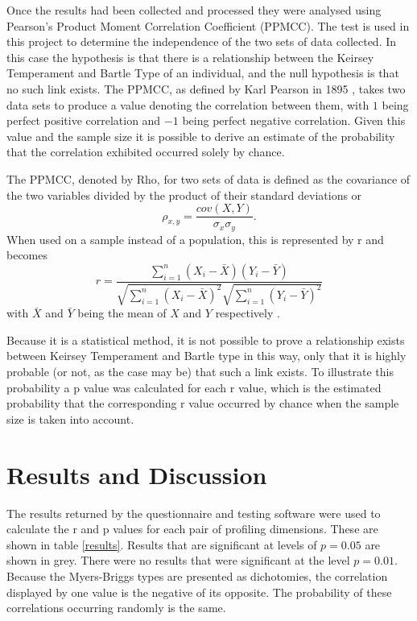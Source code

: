 \documentclass[12pt,a4paper,twoside]{report}
\begin{document}
Once the results had been collected and processed they were analysed using Pearson's Product Moment Correlation Coefficient (PPMCC). The test is used in this project to determine the independence of the two sets of data collected. In this case the hypothesis is that there is a relationship between the Keirsey Temperament and Bartle Type of an individual, and the null hypothesis is that no such link exists. The PPMCC, as defined by Karl Pearson in 1895 \cite{pearson1895note}, takes two data sets to produce a value denoting the correlation between them, with $1$ being perfect positive correlation and $-1$ being perfect negative correlation. Given this value and the sample size it is possible to derive an estimate of the probability that the correlation exhibited occurred solely by chance. 

The PPMCC, denoted by Rho, for two sets of data is defined as the covariance of the two variables divided by the product of their standard deviations or \[\rho_{x,y}=\frac{cov(X,Y)}{\sigma_x \sigma_y}.\] When used on a sample instead of a population, this is represented by r and becomes \[r=\frac{\sum_{i=1}^{n}(X_i-\bar{X})(Y_i-\bar{Y})}{\sqrt{\sum_{i=1}^{n}(X_i-\bar{X})^2}\sqrt{\sum_{i=1}^{n}(Y_i-\bar{Y})^2}}\] with $\bar{X}$ and $\bar{Y}$ being the mean of $X$ and $Y$ respectively \cite{pearson1895note}. 

\vspace{0.1cm}
Because it is a statistical method, it is not possible to prove a relationship exists between Keirsey Temperament and Bartle type in this way, only that it is highly probable (or not, as the case may be) that such a link exists. To illustrate this probability a p value was calculated for each r value, which is the estimated probability that the corresponding r value occurred by chance when the sample size is taken into account.

\section{Results and Discussion}
The results returned by the questionnaire and testing software were used to calculate the r and p values for each pair of profiling dimensions. These are shown in table \ref{results}. Results that are significant at levels of $p = 0.05$ are shown in grey. There were no results that were significant at the level $p = 0.01$. Because the Myers-Briggs types are presented as dichotomies, the correlation displayed by one value is the negative of its opposite. The probability of these correlations occurring randomly is the same.
\end{document}
